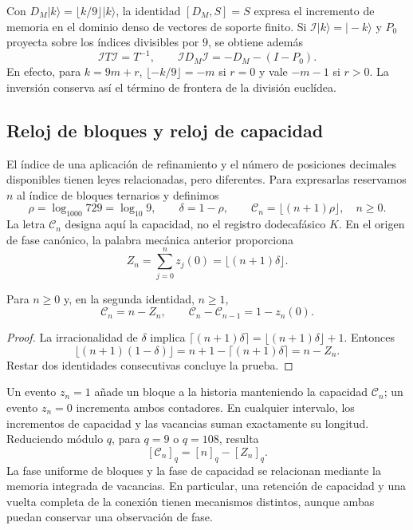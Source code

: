 Con \(D_M|k\rangle=\lfloor k/9\rfloor|k\rangle\), la identidad
\([D_M,S]=S\) expresa el incremento de memoria en el dominio denso de
vectores de soporte finito. Si \(\mathcal I|k\rangle=|-k\rangle\) y
\(P_0\) proyecta sobre los índices divisibles por \(9\), se obtiene
además
\begin{equation}
 \mathcal I T\mathcal I=T^{-1},\qquad
 \mathcal I D_M\mathcal I=-D_M-(I-P_0).
 \label{mono-ampl:inversion-contador}
\end{equation}
En efecto, para \(k=9m+r\),
\(\lfloor-k/9\rfloor=-m\) si \(r=0\) y vale \(-m-1\) si \(r>0\).
La inversión conserva así el término de frontera de la división euclídea.

\subsection{Reloj de bloques y reloj de capacidad}
\label{mono-ampl:relojes}

El índice de una aplicación de refinamiento y el número de posiciones
decimales disponibles tienen leyes relacionadas, pero diferentes. Para
expresarlas reservamos \(n\) al índice de bloques ternarios y definimos
\[
 \rho=\log_{1000}729=\log_{10}9,\qquad
 \delta=1-\rho,\qquad
 \mathcal C_n=\lfloor(n+1)\rho\rfloor,\quad n\geq0.
\]
La letra \(\mathcal C_n\) designa aquí la capacidad, no el registro
dodecafásico \(K\). En el origen de fase canónico, la palabra mecánica
anterior proporciona
\[
 Z_n=\sum_{j=0}^{n}z_j(0)=\lfloor(n+1)\delta\rfloor.
\]

\begin{proposition}
\label{mono-ampl:balance-capacidad}
Para \(n\geq0\) y, en la segunda identidad, \(n\geq1\),
\[
 \mathcal C_n=n-Z_n,\qquad
 \mathcal C_n-\mathcal C_{n-1}=1-z_n(0).
\]
\end{proposition}
\begin{proof}
La irracionalidad de \(\delta\) implica
\(\lceil(n+1)\delta\rceil=\lfloor(n+1)\delta\rfloor+1\).
Entonces
\[
 \lfloor(n+1)(1-\delta)\rfloor
 =n+1-\lceil(n+1)\delta\rceil=n-Z_n.
\]
Restar dos identidades consecutivas concluye la prueba.
\end{proof}

Un evento \(z_n=1\) añade un bloque a la historia manteniendo la capacidad
\(\mathcal C_n\); un evento \(z_n=0\) incrementa ambos contadores. En
cualquier intervalo, los incrementos de capacidad y las vacancias suman
exactamente su longitud. Reduciendo módulo \(q\), para \(q=9\) o
\(q=108\), resulta
\[
 [\mathcal C_n]_q=[n]_q-[Z_n]_q.
\]
La fase uniforme de bloques y la fase de capacidad se relacionan mediante
la memoria integrada de vacancias. En particular, una retención de
capacidad y una vuelta completa de la conexión tienen mecanismos
distintos, aunque ambas puedan conservar una observación de fase.


